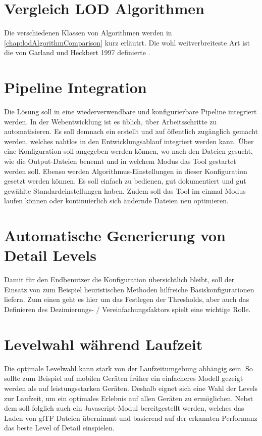 \section{Vergleich LOD Algorithmen}
Die verschiedenen Klassen von Algorithmen werden in \autoref{chap:lodAlgorithmComparison} kurz erläutrt.
Die wohl weitverbreiteste Art ist die von Garland und Heckbert 1997 definierte .
\cite{surfaceSimplificationUsingQuadricErrorMetrices}

\section{Pipeline Integration}
Die Lösung soll in eine wiederverwendbare und konfigurierbare Pipeline integriert werden.
In der Webentwicklung ist es üblich, über  Arbeitsschritte zu automatisieren. Es soll demnach ein  erstellt und auf  öffentlich zugänglich gemacht werden, welches nahtlos in den Entwicklungsablauf integriert werden kann. Über eine Konfiguration soll angegeben werden können, wo nach den  Dateien gesucht, wie die Output-Dateien benennt und in welchem Modus das Tool gestartet werden soll. Ebenso werden Algorithmus-Einstellungen in dieser Konfiguration gesetzt werden können. Es soll einfach zu bedienen, gut dokumentiert und gut gewählte Standardeinstellungen haben. Zudem soll das Tool im einmal Modus laufen können oder kontinuierlich sich ändernde Dateien neu optimieren.

\section{Automatische Generierung von Detail Levels}
Damit für den Endbenutzer die Konfiguration übersichtlich bleibt, soll der Einsatz von zum Beispiel heuristischen Methoden hilfreiche Basiskonfigurationen liefern.
Zum einen geht es hier um das Festlegen der Thresholds, aber auch das Definieren des Dezimierungs- / Vereinfachungsfaktors spielt eine wichtige Rolle.

\section{Levelwahl während Laufzeit}
Die optimale Levelwahl kann stark von der Laufzeitumgebung abhängig sein. So sollte zum Beispiel auf mobilen Geräten früher ein einfacheres Modell gezeigt werden als auf leistungsstarken Geräten.
Deshalb eignet sich eine Wahl der Levels zur Laufzeit, um ein optimales Erlebnis auf allen Geräten zu ermöglichen.
Nebst dem  soll folglich auch ein Javascript-Modul bereitgestellt werden, welches das Laden von glTF Dateien übernimmt und basierend auf der erkannten Performanz das beste Level of Detail einspielen.
